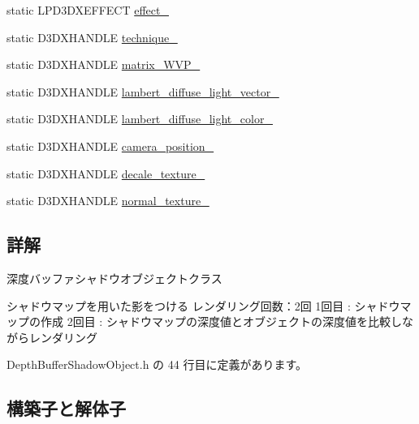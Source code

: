 \begin{DoxyCompactItemize}
\item 
static L\+P\+D3\+D\+X\+E\+F\+F\+E\+CT \mbox{\hyperlink{class_depth_buffer_shadow_object_a3b6be6422a17dc7ce3006e1af50bbd7f}{effect\+\_\+}}
\item 
static D3\+D\+X\+H\+A\+N\+D\+LE \mbox{\hyperlink{class_depth_buffer_shadow_object_ab8fd271667e849ed9dfbdf9de2fe9fa5}{technique\+\_\+}}
\item 
static D3\+D\+X\+H\+A\+N\+D\+LE \mbox{\hyperlink{class_depth_buffer_shadow_object_a9a2201b16bbf64ea9c44709c8a2de6c2}{matrix\+\_\+\+W\+V\+P\+\_\+}}
\item 
static D3\+D\+X\+H\+A\+N\+D\+LE \mbox{\hyperlink{class_depth_buffer_shadow_object_a2928e4f164d0655d1aa9aee0fe6c17a7}{lambert\+\_\+diffuse\+\_\+light\+\_\+vector\+\_\+}}
\item 
static D3\+D\+X\+H\+A\+N\+D\+LE \mbox{\hyperlink{class_depth_buffer_shadow_object_a4155ea5cadbbbae90ae677413497dda0}{lambert\+\_\+diffuse\+\_\+light\+\_\+color\+\_\+}}
\item 
static D3\+D\+X\+H\+A\+N\+D\+LE \mbox{\hyperlink{class_depth_buffer_shadow_object_acba4cb3693430a7776115fc50d63057a}{camera\+\_\+position\+\_\+}}
\item 
static D3\+D\+X\+H\+A\+N\+D\+LE \mbox{\hyperlink{class_depth_buffer_shadow_object_ab4ec29cbceae88cc38900fcd0328f308}{decale\+\_\+texture\+\_\+}}
\item 
static D3\+D\+X\+H\+A\+N\+D\+LE \mbox{\hyperlink{class_depth_buffer_shadow_object_a830c128c7b510a6d123f72fd684cd2a3}{normal\+\_\+texture\+\_\+}}
\end{DoxyCompactItemize}


\subsection{詳解}
深度バッファシャドウオブジェクトクラス 

シャドウマップを用いた影をつける レンダリング回数：2回 1回目 \+: シャドウマップの作成 2回目 \+: シャドウマップの深度値とオブジェクトの深度値を比較しながらレンダリング 

 Depth\+Buffer\+Shadow\+Object.\+h の 44 行目に定義があります。



\subsection{構築子と解体子}
\mbox{\label{class_depth_buffer_shadow_object_a2c23801a681ac79e2f9633f568634b81}} 
